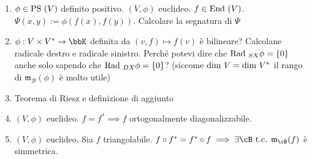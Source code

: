 \documentclass[a4paper,NoNotes,GeneralMath]{stdmdoc}
\begin{document}
\begin{enumerate}
		\item $\phi \in \mbox{PS }(V)$ definito positivo. $(V, \phi)$ euclideo. $f \in \mbox{End }(V)$. $\Psi(x,y) := \phi(f(x), f(y))$. Calcolare la segnatura di $\Psi$
		\item $\phi: V\times V^{*} \rar \bbK$ definita da $(v, f) \mapsto f(v)$ è bilineare? Calcolane radicale destro e radicale sinistro. Perché potevi dire che $\mbox{Rad }_{SX} \phi = \{0\}$ anche solo sapendo che $\mbox{Rad }_{DX} \phi = \{0\}$? (siccome $\mbox{dim } V = \mbox{dim } V^{*}$ il rango di $\mathfrak{m}_{\mathcal{B}}(\phi)$ è molto utile)
		\item Teorema di Riesz e definizione di aggiunto
		\item $(V, \phi)$ euclideo. $f = f^{*} \implies f$ ortogonalmente diagonalizzabile.
		\item $(V, \phi)$ euclideo. Sia $f$ triangolabile. $f \circ f^{*} = f^{*} \circ f \implies \exists \cB \tc \mathfrak{m}_{\cB}(f)$ è simmetrica.
	\end{enumerate}
\end{document}
